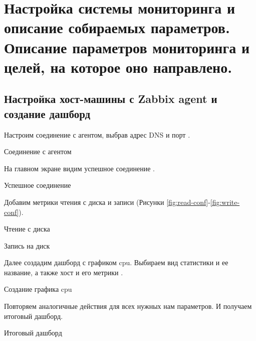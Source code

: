 \section{Настройка системы мониторинга и описание собираемых параметров.
Описание параметров мониторинга и целей, на которое оно направлено.}

\subsection{Настройка хост-машины с Zabbix agent и создание дашборд}

Настроим соединение с агентом, выбрав адрес DNS и порт .

\begin{image}
    \caption{Соединение с агентом}
    \label{fig:host-conf}
\end{image}

На главном экране видим успешное соединение .

\begin{image}
    \caption{Успешное соединение}
    \label{fig:main-dash-board}
\end{image}

Добавим метрики чтения с диска и записи
(Рисунки \ref{fig:read-conf}-\ref{fig:write-conf}).

\begin{image}
    \caption{Чтение с диска}
    \label{fig:read-conf}
\end{image}

\begin{image}
    \caption{Запись на диск}
    \label{fig:write-conf}
\end{image}

Далее создадим дашборд с графиком cpu.
Выбираем вид статистики и ее название,
а также хост и его метрики .

\begin{image}
    \caption{Создание графика cpu}
    \label{fig:cpu}
\end{image}

Повторяем аналогичные действия для всех нужных нам параметров.
И получаем итоговый дашборд.

\begin{image}
    \caption{Итоговый дашборд}
    \label{fig:all:dash-board}
\end{image}

